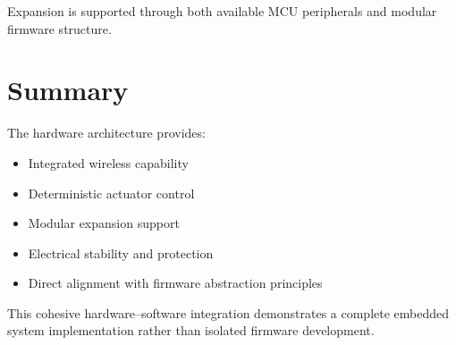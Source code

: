 Expansion is supported through both available MCU peripherals and modular firmware structure.


\section{Summary}

The hardware architecture provides:

\begin{itemize}
	\item Integrated wireless capability
	\item Deterministic actuator control
	\item Modular expansion support
	\item Electrical stability and protection
	\item Direct alignment with firmware abstraction principles
\end{itemize}

This cohesive hardware–software integration demonstrates a complete embedded system implementation rather than isolated firmware development.